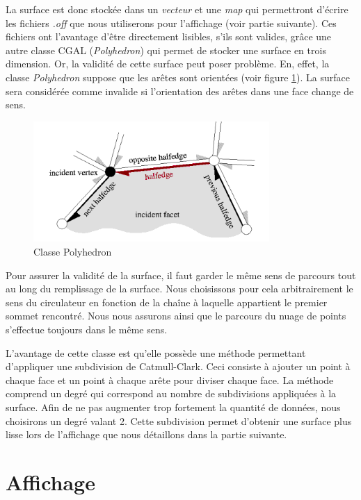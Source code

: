 La surface est donc stockée dans un \textit{vecteur} et une \textit{map} qui permettront
d'écrire les fichiers \textit{.off} que nous utiliserons pour l'affichage (voir partie
suivante). Ces fichiers ont l'avantage d'être directement lisibles, s'ils sont valides,
grâce une autre classe CGAL (\textit{Polyhedron}) qui permet de stocker
une surface en trois dimension.
Or, la validité de cette surface peut poser problème. En, effet, la classe \textit{Polyhedron}
suppose que les arêtes sont orientées (voir figure \ref{fig::polyheder}). La surface
sera considérée comme invalide si l'orientation des arêtes dans une face change de sens.
\begin{figure}[ht]
\centering
  \includegraphics[width=0.8\textwidth]{figures/polyheder.png}
  \caption{Classe Polyhedron \cite{CGAL}}
  \label{fig::polyheder}
\end{figure}

Pour assurer la validité de la surface, il faut garder le même sens de parcours
tout au long du remplissage de la surface. Nous choisissons pour cela arbitrairement le sens
du circulateur en fonction de la chaîne à laquelle appartient le premier sommet rencontré.
Nous nous assurons ainsi que le parcours du nuage de points s'effectue toujours dans le même
sens.



 L'avantage de cette classe est qu'elle possède
une méthode permettant d'appliquer une subdivision de Catmull-Clark. Ceci consiste
à ajouter un point à chaque face et un point à chaque arête pour diviser chaque face.
La méthode comprend un degré qui correspond au nombre de subdivisions appliquées à
la surface. Afin de ne pas augmenter trop fortement la quantité de données, nous choisirons
un degré valant 2.
Cette subdivision permet d'obtenir une surface plus lisse lors de l'affichage que nous détaillons
dans la partie suivante.


\section{Affichage}

